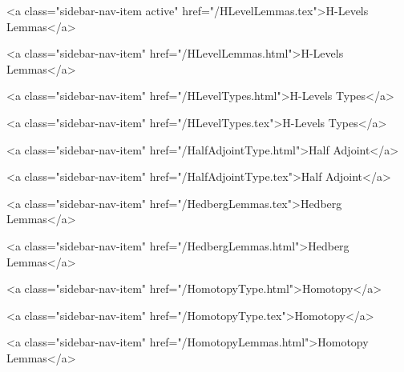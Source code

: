       
        
          <a class="sidebar-nav-item active" href="/HLevelLemmas.tex">H-Levels Lemmas</a>
        
      
    
      
        
          <a class="sidebar-nav-item" href="/HLevelLemmas.html">H-Levels Lemmas</a>
        
      
    
      
        
          <a class="sidebar-nav-item" href="/HLevelTypes.html">H-Levels Types</a>
        
      
    
      
        
          <a class="sidebar-nav-item" href="/HLevelTypes.tex">H-Levels Types</a>
        
      
    
      
        
          <a class="sidebar-nav-item" href="/HalfAdjointType.html">Half Adjoint</a>
        
      
    
      
        
          <a class="sidebar-nav-item" href="/HalfAdjointType.tex">Half Adjoint</a>
        
      
    
      
        
          <a class="sidebar-nav-item" href="/HedbergLemmas.tex">Hedberg Lemmas</a>
        
      
    
      
        
          <a class="sidebar-nav-item" href="/HedbergLemmas.html">Hedberg Lemmas</a>
        
      
    
      
        
          <a class="sidebar-nav-item" href="/HomotopyType.html">Homotopy</a>
        
      
    
      
        
          <a class="sidebar-nav-item" href="/HomotopyType.tex">Homotopy</a>
        
      
    
      
        
          <a class="sidebar-nav-item" href="/HomotopyLemmas.html">Homotopy Lemmas</a>
        
      
    
